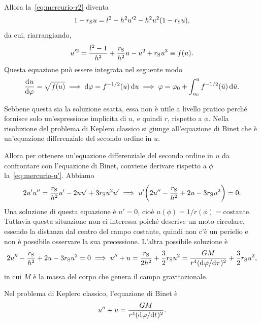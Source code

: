 Allora la~\eqref{eq:mercurio-r2} diventa
\begin{equation}
  1 - r_{\textup{S}}u = l^{2} - h^{2}u'^{2} - h^{2}u^{2}(1 - r_{\textup{S}}u),
\end{equation}
da cui, riarrangiando,
\begin{equation}
  \label{eq:mercurio-u'}
  u'^{2} = \frac{l^{2} - 1}{h^{2}} + \frac{r_{\textup{S}}}{h^{2}}u - u^{2} +
  r_{\textup{S}}u^{3} \equiv f(u).
\end{equation}
Questa equazione può essere integrata nel seguente modo
\begin{equation}
  \frac{{\mathop{}\!\mathrm{d}^{}}u}{\mathop{}\!\mathrm{d} {\varphi}^{}} = \sqrt{f(u)} \implies \mathop{}\!\mathrm{d}\varphi = f^{-1/2}(u) \mathop{}\!\mathrm{d} u \implies
  \varphi = \varphi_{0} + \int_{u_{0}}^{u} f^{-1/2}(\tilde{u}) \mathop{}\!\mathrm{d} \tilde{u}.
\end{equation}

Sebbene questa sia la soluzione esatta, essa non è utile a livello pratico
perché fornisce solo un'espressione implicita di $u$, e quindi $r$, rispetto a
$\phi$.  Nella risoluzione del problema di Keplero classico si giunge
all'equazione di Binet che è un'equazione differenziale del secondo ordine in
$u$.

Allora per ottenere un'equazione differenziale del secondo ordine in $u$ da
confrontare con l'equazione di Binet, conviene derivare rispetto a $\phi$
la~\eqref{eq:mercurio-u'}.  Abbiamo
\begin{equation}
  \label{eq:mercurio1}
  2u'u'' = \frac{r_{\textup{S}}}{h^{2}}u' - 2uu' + 3r_{\textup{S}}u^{2}u'
  \implies u'\bigg(2u'' - \frac{r_{\textup{S}}}{h^{2}} + 2u -
  3r_{\textup{S}}u^{2}\bigg) = 0.
\end{equation}
Una soluzione di questa equazione è $u' = 0$, cioè $u(\phi) = 1/r(\phi) =
\text{costante}$.  Tuttavia questa situazione non ci interessa poiché descrive
un moto circolare, essendo la distanza dal centro del campo costante, quindi non
c'è un perielio e non è possibile osservare la sua precessione.  L'altra
possibile soluzione è
\begin{equation}
  \label{eq:binet-relativ}
  2u'' - \frac{r_{\textup{S}}}{h^{2}} + 2u - 3r_{\textup{S}}u^{2} = 0 \implies
  u'' + u = \frac{r_{\textup{S}}}{2h^{2}} + \frac{3}{2}r_{\textup{S}}u^{2} =
  \frac{GM}{r^{4}(\mathrm{d}^{}\varphi / \mathrm{d} {\tau}^{})^{2}} + \frac{3}{2}r_{\textup{S}}u^{2},
\end{equation}
in cui $M$ è la massa del corpo che genera il campo gravitazionale.

Nel problema di Keplero classico, l'equazione di Binet
è
\begin{equation}
  \label{eq:binet}
  u'' + u = \frac{GM}{r^{4}(\mathrm{d}^{}\varphi / \mathrm{d} {t}^{})^{2}}.
\end{equation}

